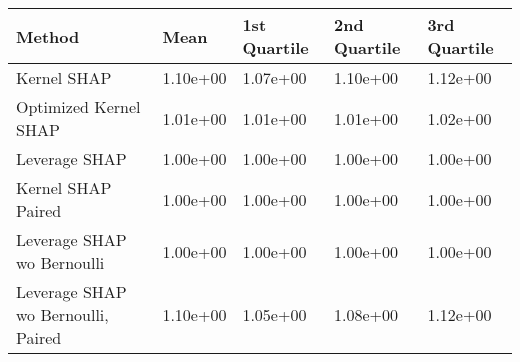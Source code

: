 \begin{tabular}{lllll}
  \toprule
  \textbf{Method} & \textbf{Mean} & \textbf{1st Quartile} & \textbf{2nd Quartile} & \textbf{3rd Quartile} \\ \midrule 
Kernel SHAP & 1.10e+00 & 1.07e+00 & 1.10e+00 & 1.12e+00\\
Optimized Kernel SHAP & 1.01e+00 & 1.01e+00 & 1.01e+00 & 1.02e+00\\
Leverage SHAP & \cellcolor{gold!60}1.00e+00 & \cellcolor{gold!60}1.00e+00 & \cellcolor{gold!60}1.00e+00 & \cellcolor{gold!60}1.00e+00\\
Kernel SHAP Paired & \cellcolor{gold!60}1.00e+00 & \cellcolor{gold!60}1.00e+00 & \cellcolor{gold!60}1.00e+00 & \cellcolor{gold!60}1.00e+00\\
Leverage SHAP wo Bernoulli & \cellcolor{gold!60}1.00e+00 & \cellcolor{gold!60}1.00e+00 & \cellcolor{gold!60}1.00e+00 & \cellcolor{gold!60}1.00e+00\\
Leverage SHAP wo Bernoulli, Paired & 1.10e+00 & 1.05e+00 & 1.08e+00 & 1.12e+00\\
\bottomrule
\end{tabular}
